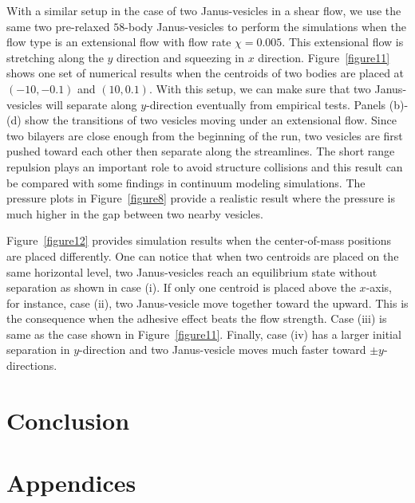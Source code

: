 \documentclass[lineno]{jfm}
\begin{document}
With a similar setup in the case of two Janus-vesicles in a shear flow, we use the same two pre-relaxed $58$-body Janus-vesicles to perform the simulations when the flow type is an extensional flow with flow rate $\chi=0.005$. This extensional flow is stretching along the $y$ direction and squeezing in $x$ direction.
Figure~\ref{figure11} shows one set of numerical results when the centroids of two bodies are placed at
$(-10,-0.1)$ and $(10,0.1)$. With this setup, we can make sure that two Janus-vesicles will separate along 
$y$-direction eventually from empirical tests. Panels (b)-(d) show the transitions of two vesicles moving under an extensional flow.  Since two bilayers are close enough from the beginning of the run, two vesicles are first pushed toward each other then separate along the streamlines. The short range repulsion plays an important role to avoid structure collisions and this result can be compared with some findings in continuum modeling simulations. The pressure plots in Figure~\ref{figure8} provide a realistic result where the pressure is much higher in the gap between two nearby vesicles. 

Figure~\ref{figure12} provides simulation results when the center-of-mass positions are placed differently.
One can notice that when two centroids are placed on the same horizontal level, two Janus-vesicles reach
an equilibrium state without separation as shown in case (i). If only one centroid is placed above the $x$-axis, for instance, case (ii), two Janus-vesicle move together toward the upward. This is the consequence when the adhesive effect beats the flow strength. Case (iii) is same as the case shown in Figure~\ref{figure11}. Finally, case (iv) has a larger initial separation in $y$-direction and two Janus-vesicle moves much faster toward 
$\pm y$-directions.






\section{\label{conclusion}Conclusion}


\begin{acknowledgments}
\end{acknowledgments}

\appendix

\section{Appendices}
\label{sec:appendixA}
\end{document}
